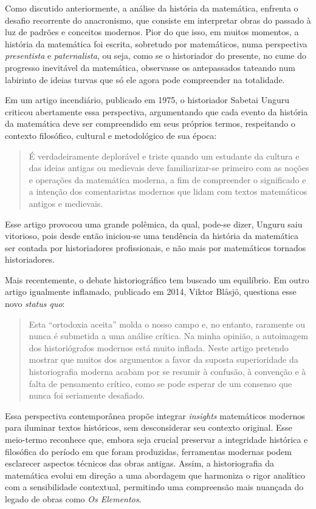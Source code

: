 \documentclass{hipatia}
\begin{document}
Como discutido anteriormente, a análise da história
da matemática, enfrenta o desafio recorrente do anacronismo,
que consiste em interpretar obras do passado
à luz de padrões e conceitos
modernos. Pior do que isso, em muitos momentos,
a história da matemática foi escrita,
sobretudo por matemáticos,
numa perspectiva \emph{presentista} e \emph{paternalista},
ou seja, 
como se o historiador do presente, no cume do
progresso inevitável da matemática, observasse 
os antepassados tateando num labirinto de ideias turvas
que só ele agora pode compreender na totalidade.

Em um artigo incendiário, publicado em 1975,
o historiador Sabetai Unguru criticou 
abertamente essa perspectiva, 
argumentando que cada evento da história da 
matemática deve ser
compreendido em seus próprios termos, respeitando o contexto
filosófico, cultural e metodológico de sua época:
\begin{quote}
	É verdadeiramente deplorável e triste
quando um estudante da cultura e das
ideias antigas ou medievais deve
familiarizar-se primeiro com as noções
e operações da matemática moderna,
a fim de compreender o significado e a
intenção dos comentaristas modernos
que lidam com textos matemáticos
antigos e medievais.\cite{unguru1975}
\end{quote}
Esse artigo provocou uma grande polêmica,
da qual, pode-se dizer, Unguru saiu
vitorioso, pois desde então iniciou-se uma
tendência da história da matemática 
ser contada por historiadores profissionais,
e não mais por matemáticos tornados 
historiadores.


Mais recentemente, o debate historiográfico tem buscado um
equilíbrio. Em outro artigo igualmente inflamado,
publicado em 2014,
Viktor Blåsjö, questiona esse novo \emph{status quo}:
\begin{quote}
	Esta ``ortodoxia aceita'' molda o nosso
campo e, no entanto, raramente ou
nunca é submetida a uma análise crítica.
Na minha opinião, a autoimagem dos
historiógrafos modernos está muito
inflada. Neste artigo pretendo mostrar
que muitos dos argumentos a favor da
suposta superioridade da historiografia
moderna acabam por se resumir à
confusão, à convenção e à falta de
pensamento crítico, como se pode
esperar de um consenso que nunca foi
seriamente desafiado.\cite{blasjon2014}
\end{quote}
Essa perspectiva contemporânea propõe integrar
\emph{insights} matemáticos modernos para iluminar textos
históricos, sem desconsiderar seu contexto original. Esse
meio-termo reconhece que, embora 
seja crucial preservar a integridade histórica e filosófica do
período em que foram produzidas,
ferramentas modernas podem
esclarecer aspectos técnicos das obras antigas.
Assim, a historiografia da
matemática evolui em direção a uma abordagem que harmoniza o
rigor analítico com a sensibilidade contextual, permitindo
uma compreensão mais nuançada do legado de obras como 
\emph{Os Elementos}.
\end{document}
